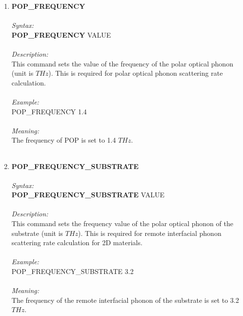 \documentclass[12pt]{article}
\begin{document}
\begin{enumerate}
    \item \textbf{POP\_FREQUENCY}  \\ \\
    \textit{Syntax:} \\
    \textbf{POP\_FREQUENCY} VALUE \\ \\
    \textit{Description:} \\
    This command sets the value of the frequency of the polar optical phonon (unit is $THz$). This is required for polar optical phonon scattering rate calculation. \\ \\
    \textit{Example:} \\
    POP\_FREQUENCY 1.4 \\ \\
    \textit{Meaning:} \\   
    The frequency of POP is set to 1.4 $THz$. \\ \\ 

    \item \textbf{POP\_FREQUENCY\_SUBSTRATE}   \\ \\
    \textit{Syntax:} \\
    \textbf{POP\_FREQUENCY\_SUBSTRATE} VALUE \\ \\
    \textit{Description:} \\
    This command sets the frequency value of the polar optical phonon of the substrate (unit is $THz$). This is required for remote interfacial phonon scattering rate calculation for 2D materials. \\ \\
    \textit{Example:} \\
    POP\_FREQUENCY\_SUBSTRATE 3.2 \\ \\
    \textit{Meaning:} \\   
    The frequency of the remote interfacial phonon of the substrate is set to 3.2 $THz$. \\ \\ 


\end{enumerate}
\end{document}

